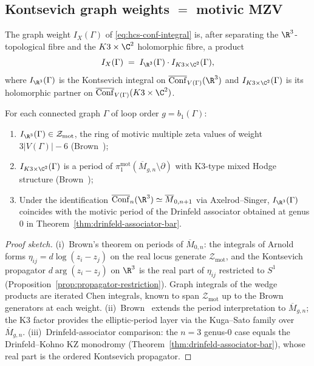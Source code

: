 \subsection{Kontsevich graph weights $=$ motivic MZV}
\label{subsec:hcs-motivic-mzv}

The graph weight $I_{X}(\Gamma)$ of \eqref{eq:hcs-conf-integral} is,
after separating the $\R^{3}$-topological fibre and the $K3\times\C^{2}$
holomorphic fibre, a product
\begin{equation}\label{eq:graph-weight-factorisation}
 I_{X}(\Gamma) \;=\; I_{\R^{3}}(\Gamma)\cdot I_{K3\times\C^{2}}(\Gamma),
\end{equation}
where $I_{\R^{3}}(\Gamma)$ is the Kontsevich integral on
$\overline{\Conf}_{V(\Gamma)}(\R^{3})$ and $I_{K3\times\C^{2}}(\Gamma)$
is its holomorphic partner on
$\overline{\Conf}_{V(\Gamma)}(K3\times\C^{2})$.

\begin{theorem}[Periods on $\overline{M}_{g,n}$ $=$ motivic MZVs]
\label{thm:hcs-motivic}
\ClaimStatusProvedElsewhere
For each connected graph $\Gamma$ of loop order $g = b_{1}(\Gamma)$:
\begin{enumerate}[label=\textup{(\roman*)}]
\item $I_{\R^{3}}(\Gamma) \in \mathcal{Z}_{\mathrm{mot}}$, the ring of
motivic multiple zeta values of weight $3|V(\Gamma)|-6$
(Brown~\cite{Brown2012});
\item $I_{K3\times\C^{2}}(\Gamma)$ is a period of
$\pi_{1}^{\mathrm{mot}}(\overline{M}_{g,n}\setminus\partial)$ with
K3-type mixed Hodge structure
(Brown~\cite{Brown2017});
\item Under the identification
$\overline{\Conf}_{n}(\R^{3})\simeq\overline{M}_{0,n+1}$ via
Axelrod--Singer, $I_{\R^{3}}(\Gamma)$ coincides with the motivic period of the
Drinfeld associator obtained at genus $0$ in
Theorem~\ref{thm:drinfeld-associator-bar}.
\end{enumerate}
\end{theorem}

\begin{proof}[Proof sketch]
(i)~Brown's theorem on periods of $\overline{M}_{0,n}$: the integrals of
Arnold forms $\eta_{ij} = d\log(z_{i}-z_{j})$ on the real locus
generate $\mathcal{Z}_{\mathrm{mot}}$, and the Kontsevich propagator
$d\arg(z_{i}-z_{j})$ on $\R^{3}$ is the real part of $\eta_{ij}$ restricted
to $S^{1}$ (Proposition~\ref{prop:propagator-restriction}). Graph
integrals of the wedge products are iterated Chen integrals, known to
span $\mathcal{Z}_{\mathrm{mot}}$ up to the Brown generators at each
weight.
(ii)~Brown~\cite{Brown2017} extends the period interpretation to
$\overline{M}_{g,n}$; the K3 factor provides the elliptic-period layer
via the Kuga--Sato family over $\overline{M}_{g,n}$.
(iii)~Drinfeld-associator comparison: the $n = 3$ genus-0 case equals
the Drinfeld--Kohno KZ monodromy (Theorem~\ref{thm:drinfeld-associator-bar}),
whose real part is the ordered Kontsevich propagator.
\end{proof}

